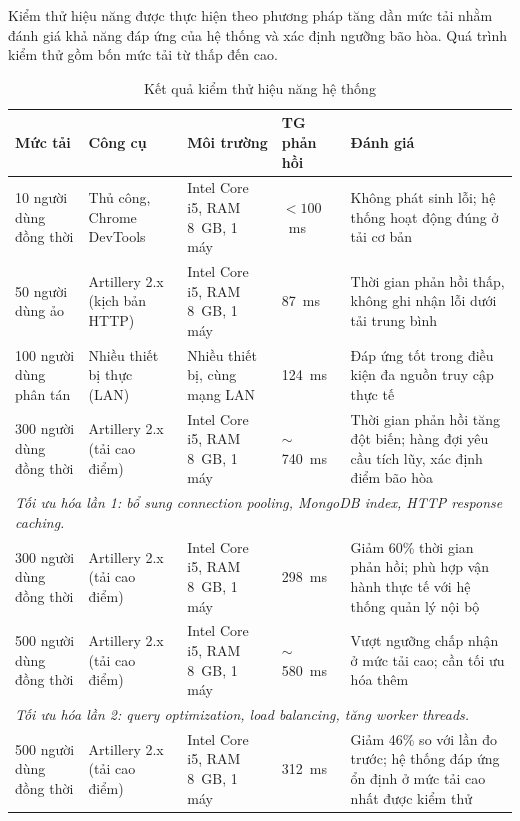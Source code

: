 \documentclass[../DoAn.tex]{subfiles}
\begin{document}
Kiểm thử hiệu năng được thực hiện theo phương pháp tăng dần mức tải nhằm đánh giá khả năng đáp ứng của hệ thống và xác định ngưỡng bão hòa. Quá trình kiểm thử gồm bốn mức tải từ thấp đến cao.
\begin{table}[H]
\centering
\caption{Kết quả kiểm thử hiệu năng hệ thống}
\label{tab:performance-test}
\footnotesize
\begin{tabular}{|p{2.8cm}|p{3cm}|p{3cm}|p{1.5cm}|p{4cm}|}
\hline
\textbf{Mức tải} & \textbf{Công cụ} & \textbf{Môi trường} & \textbf{TG phản hồi} & \textbf{Đánh giá} \\
\hline
10 người dùng đồng thời
  & Thủ công, Chrome DevTools
  & Intel Core i5, RAM 8~GB, 1 máy
  & $<100$~ms
  & Không phát sinh lỗi; hệ thống hoạt động đúng ở tải cơ bản \\
\hline
50 người dùng ảo
  & Artillery 2.x (kịch bản HTTP)
  & Intel Core i5, RAM 8~GB, 1 máy
  & 87~ms
  & Thời gian phản hồi thấp, không ghi nhận lỗi dưới tải trung bình \\
\hline
100 người dùng phân tán
  & Nhiều thiết bị thực (LAN)
  & Nhiều thiết bị, cùng mạng LAN
  & 124~ms
  & Đáp ứng tốt trong điều kiện đa nguồn truy cập thực tế \\
\hline
300 người dùng đồng thời
  & Artillery 2.x (tải cao điểm)
  & Intel Core i5, RAM 8~GB, 1 máy
  & $\sim$740~ms
  & Thời gian phản hồi tăng đột biến; hàng đợi yêu cầu tích lũy, xác định điểm bão hòa \\
\hline
\multicolumn{5}{|l|}{\textit{Tối ưu hóa lần 1: bổ sung connection pooling, MongoDB index, HTTP response caching.}} \\
\hline
300 người dùng đồng thời
  & Artillery 2.x (tải cao điểm)
  & Intel Core i5, RAM 8~GB, 1 máy
  & 298~ms
  & Giảm 60\% thời gian phản hồi; phù hợp vận hành thực tế với hệ thống quản lý nội bộ \\
\hline
500 người dùng đồng thời
  & Artillery 2.x (tải cao điểm)
  & Intel Core i5, RAM 8~GB, 1 máy
  & $\sim$580~ms
  & Vượt ngưỡng chấp nhận ở mức tải cao; cần tối ưu hóa thêm \\
\hline
\multicolumn{5}{|l|}{\textit{Tối ưu hóa lần 2: query optimization, load balancing, tăng worker threads.}} \\
\hline
500 người dùng đồng thời
  & Artillery 2.x (tải cao điểm)
  & Intel Core i5, RAM 8~GB, 1 máy
  & 312~ms
  & Giảm 46\% so với lần đo trước; hệ thống đáp ứng ổn định ở mức tải cao nhất được kiểm thử \\
\hline
\end{tabular}
\end{table}
\end{document}
